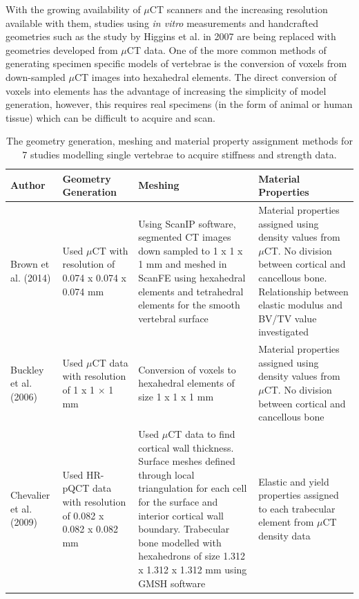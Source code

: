 With the growing availability of $\mu$CT scanners and the increasing
resolution available with them, studies using \emph{in vitro}
measurements and handcrafted geometries such as the study by Higgins et
al. \cite{Higgins2007a} in 2007 are being replaced with geometries developed
from
$\mu$CT data. One of the more common methods of generating specimen specific
models of vertebrae is the conversion of voxels from down-sampled $\mu$CT
images into hexahedral elements. The direct conversion of voxels into
elements has the advantage of increasing the simplicity of model
generation, however, this requires real specimens (in the form of animal or human tissue)
which can be difficult to acquire and scan.

\begin{landscape}

\begin{longtable}{P{3cm}|P{2.5cm}|P{5.5cm}|P{5cm}}
\caption{The geometry generation, meshing and material property
assignment methods for 7 studies modelling single vertebrae to acquire
stiffness and strength data.}
\label{tab:geoNmesh}
\\
Author & Geometry Generation & Meshing & Material Properties \\
\hline
\hline
Brown et al. (2014) \cite{RobsonBrown2014} & Used $\mu$CT with resolution of 0.074 x
0.074 x 0.074 mm & Using ScanIP software, segmented CT images down sampled to 1
x 1 x 1 mm and meshed in ScanFE using hexahedral elements and
tetrahedral elements for the smooth vertebral surface & Material
properties assigned using density values from $\mu$CT. No division between
cortical and cancellous bone. Relationship between elastic modulus and
BV/TV value investigated\\
 \hline
 Buckley et al. (2006) \cite{Buckley2006} & Used $\mu$CT data with resolution of 1 x 1
$\times$
1 mm &
Conversion of voxels to hexahedral elements of size 1 x 1 x 1 mm &
Material properties assigned using density values from $\mu$CT. No division
between cortical and cancellous bone\\
\hline
Chevalier et al. (2009) \cite{Chevalier2009} & Used HR-pQCT data with resolution of
0.082 x
0.082 x 0.082 mm & Used $\mu$CT data to find cortical wall thickness.
Surface meshes defined through local triangulation for each cell for the
surface and interior cortical wall boundary. Trabecular bone modelled
with hexahedrons of size 1.312 x 1.312 x 1.312 mm using GMSH software &
Elastic and yield properties assigned to each trabecular element from
$\mu$CT density data\\

\end{longtable}
\end{landscape}
